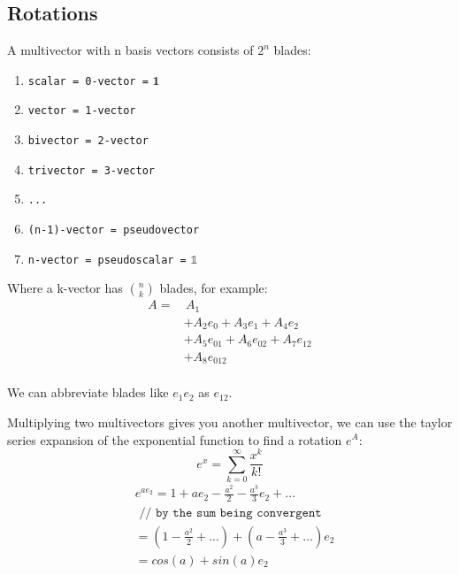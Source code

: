 \documentclass[twoside]{article}
\newcommand{\F}[2]{\frac{#1}{#2}} %
\newcommand{\aside}[1]{\begin{flushright}\scriptsize{#1}\end{flushright}}
\begin{document}
\begin{multicols*}{2}
        \section{Rotations}
            \par
                A multivector with n basis vectors consists of $ 2^n $ blades:
                \begin{enumerate}[-]
                    \item \texttt{scalar = 0-vector =} $\mathbf{1}$
                    \item \texttt{vector = 1-vector}
                    \item \texttt{bivector = 2-vector}
                    \item \texttt{trivector = 3-vector}
                    \item \texttt{...}
                    \item \texttt{(n-1)-vector = pseudovector}
                    \item \texttt{n-vector = pseudoscalar =} $\mathbb{1}$
                \end{enumerate} \vspace{5px}
                Where a k-vector has $n \choose k$ blades, for example:
                $$\begin{aligned}
                    A = & \, A_1 \\
                    &+ A_2 e_0 + A_3 e_1 + A_4 e_2 \\
                    &+ A_5 e_{01} + A_6 e_{02} + A_7 e_{12} \\
                    &+ A_8 e_{012} \\
                \end{aligned}$$
                \aside{We can abbreviate blades like $ e_1 e_2 $ as $ e_{12} $.}
            \par
                Multiplying two multivectors gives you another multivector,
                we can use the taylor series expansion of the exponential function
                to find a rotation $e^A$:
                $$ e^x = \sum_{k=0}^\infty \F{x^k}{k!} $$
                $$\begin{aligned}
                    &e^{a e_2} = 1 + a e_2 - \F{a^2}{2} - \F{a^3}{3} e_2 + ... \\
                    &\texttt{ // by the sum being convergent} \\
                    &= (1 - \F{a^2}{2} + ...) + (a - \F{a^3}{3} + ...) e_2 \\
                    &= cos(a) + sin(a) e_2 \\

\end{aligned}$$
\end{multicols*}
\end{document}
